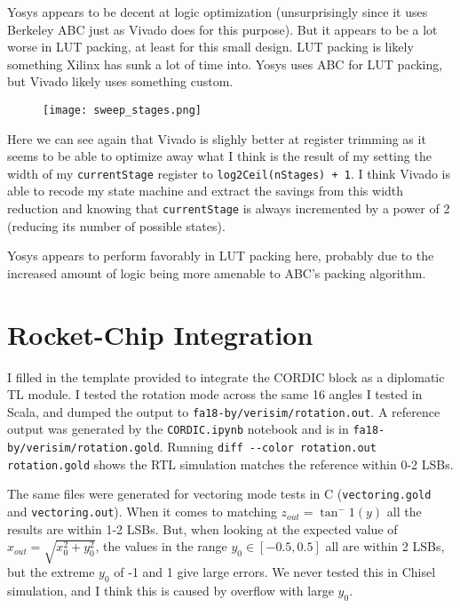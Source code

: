 Yosys appears to be decent at logic optimization (unsurprisingly since it uses Berkeley ABC just as Vivado does for this purpose). But it appears to be a lot worse in LUT packing, at least for this small design. LUT packing is likely something Xilinx has sunk a lot of time into. Yosys uses ABC for LUT packing, but Vivado likely uses something custom.

\begin{figure}[H]
    \centerline{\texttt{[image: sweep\_stages.png]}}
\end{figure}

Here we can see again that Vivado is slighly better at register trimming as it seems to be able to optimize away what I think is the result of my setting the width of my \verb|currentStage| register to \verb|log2Ceil(nStages) + 1|. I think Vivado is able to recode my state machine and extract the savings from this width reduction and knowing that \verb|currentStage| is always incremented by a power of 2 (reducing its number of possible states).

Yosys appears to perform favorably in LUT packing here, probably due to the increased amount of logic being more amenable to ABC's packing algorithm.

\section{Rocket-Chip Integration}
I filled in the template provided to integrate the CORDIC block as a diplomatic TL module. I tested the rotation mode across the same 16 angles I tested in Scala, and dumped the output to \verb|fa18-by/verisim/rotation.out|. A reference output was generated by the \verb|CORDIC.ipynb| notebook and is in \verb|fa18-by/verisim/rotation.gold|. Running \verb|diff --color rotation.out rotation.gold| shows the RTL simulation matches the reference within 0-2 LSBs.

The same files were generated for vectoring mode tests in C (\verb|vectoring.gold| and \verb|vectoring.out|). When it comes to matching $z_{out} = \tan^-1(y)$ all the results are within 1-2 LSBs. But, when looking at the expected value of $x_{out} = \sqrt{x_0^2 + y_0^2}$, the values in the range $y_0 \in [-0.5,0.5]$ all are within 2 LSBs, but the extreme $y_0$ of -1 and 1 give large errors. We never tested this in Chisel simulation, and I think this is caused by overflow with large $y_0$.


